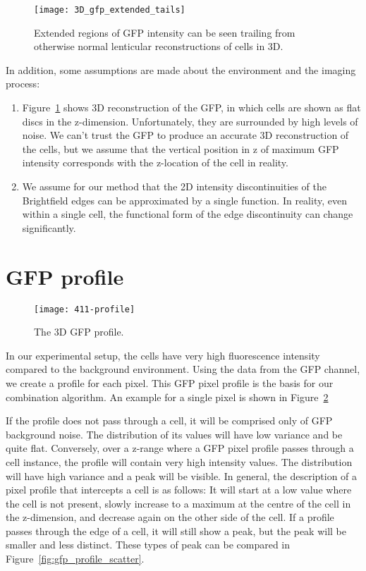 \begin{figure}[htbp!]
\centering
\texttt{[image: 3D\_gfp\_extended\_tails]}
\caption[GFP 3D reconstruction]{Extended regions of GFP intensity can be seen trailing from otherwise normal lenticular reconstructions of cells in 3D.}
\label{fig:gfp_3d_recon}
\end{figure}

In addition, some assumptions are made about the environment and the imaging process:
\begin{enumerate}
\item Figure~\ref{fig:gfp_3d_recon} shows 3D reconstruction of the GFP, in which cells are shown as flat discs in the z-dimension. Unfortunately, they are surrounded by high levels of noise. We can't trust the GFP to produce an accurate 3D reconstruction of the cells, but we assume that the vertical position in z of maximum GFP intensity corresponds with the z-location of the cell in reality.
\item We assume for our method that the 2D intensity discontinuities of the Brightfield edges can be approximated by a single function. In reality, even within a single cell, the functional form of the edge discontinuity can change significantly.
\end{enumerate}

\section{GFP profile}

\begin{figure}[htbp!]
\centering
\texttt{[image: 411-profile]}
\caption[GFP profile]{The 3D GFP profile.}
\label{fig:3D_gfp_profile}
\end{figure}

In our experimental setup, the cells have very high fluorescence intensity compared to the background environment. Using the data from the GFP channel, we create a profile for each pixel. This GFP pixel profile is the basis for our combination algorithm. An example for a single pixel is shown in Figure~\ref{fig:3D_gfp_profile}

If the profile does not pass through a cell, it will be comprised only of GFP background noise. The distribution of its values will have low variance and be quite flat. Conversely, over a z-range where a GFP pixel profile passes through a cell instance, the profile will contain very high intensity values. The distribution will have high variance and a peak will be visible. In general, the description of a pixel profile that intercepts a cell is as follows: It will start at a low value where the cell is not present, slowly increase to a maximum at the centre of the cell in the z-dimension, and decrease again on the other side of the cell. If a profile passes through the edge of a cell, it will still show a peak, but the peak will be smaller and less distinct. These types of peak can be compared in Figure~\ref{fig:gfp_profile_scatter}.

